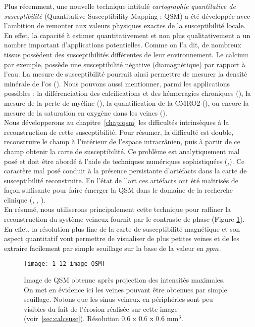 Plus récemment, une nouvelle technique intitulé {\em cartographie quantitative de susceptibilité} (Quantitative Susceptibility Mapping : QSM) a été développée avec l’ambition de remonter aux valeurs physiques exactes de la susceptibilité locale. En effet, la capacité à estimer quantitativement et non plus qualitativement a un nombre important d’applications potentielles. Comme on l'a dit, de nombreux tissus possèdent des susceptibilités différentes de leur environnement. Le calcium par exemple, possède une susceptibilité négative (diamagnétique) par rapport à l’eau. La mesure de susceptibilité pourrait ainsi permettre de mesurer la densité minérale de l’os (\cite{Chung1996}). Nous pouvons aussi mentionner, parmi les applications possibles : la différenciation des calcifications et des hémorragies chroniques (\cite{Kozic2009}), la mesure de la perte de myéline (\cite{Liu2011}), la quantification de la CMRO2 (\cite{Zhang2014}), ou encore la mesure de la saturation en oxygène dans les veines (\cite{Fan2014}).\\
Nous développerons au chapitre~\ref{chap:qsm} les difficultés intrinsèques à la reconstruction de cette susceptibilité. Pour résumer, la difficulté est double, reconstruire le champ à l’intérieur de l’espace intracrânien, puis à partir de ce champ obtenir la carte de susceptibilité. Ce problème est analytiquement mal posé et doit être abordé à l’aide de techniques numériques sophistiquées (\cite{Haacke2005},\cite{Shmueli2009}). Ce caractère mal posé conduit à la présence persistante d’artéfacts dans la carte de susceptibilité reconstruite. En l’état de l’art ces artéfacts ont été maîtrisés de façon suffisante pour faire émerger la QSM dans le domaine de la recherche clinique (\cite{Wang_Liu_2014}, \cite{Bilgic2013}, \cite{Deistung2013}).\\
En résumé, nous utiliserons principalement cette technique pour raffiner la reconstruction du système veineux fournit par le contraste de phase (Figure \ref{fig:1_12_image_QSM}). En effet, la résolution plus fine de la carte de susceptibilité magnétique et son aspect quantitatif vont permettre de visualiser de plus petites veines et de les extraire facilement par simple seuillage sur la base de la valeur en $ppm$.
\begin{figure}[!t]
\centering
\texttt{[image: 1\_12\_image\_QSM]}
\caption{Image de QSM obtenue après projection des intensités maximales. On met en évidence ici les veines pouvant être obtenues par simple seuillage. Notons que les sinus veineux en périphéries sont peu visibles du fait de l’érosion réalisée sur cette image (voir~\ref{sec:calcsusc}). Résolution 0.6 x 0.6 x 0.6 mm$^3$.}
\label{fig:1_12_image_QSM}	
\end{figure}

